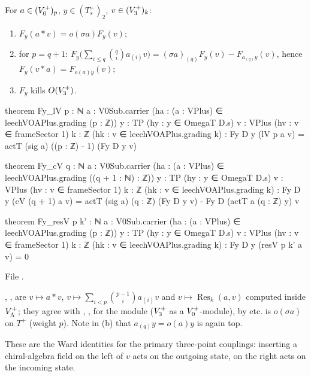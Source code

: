 \begin{theorem}\label{ch14:thm:Fy}
For $a\in(V_0^{+})_p$, $y\in(T_s^+)_2$, $v\in(V_3^{+})_k$:
\begin{enumerate}[label=(\alph*)]
\item $F_y(a*v)=o(\sigma a)F_y(v)$;
\item for $p=q+1$: $F_y\bigl(\sum_{i\le q}\binom qi a_{(i)}v\bigr)=(\sigma a)_{(q)}F_y(v)-F_{a_{(q)}y}(v)$, hence
  $F_y(v*a)=F_{o(a)y}(v)$;
\item $F_y$ kills $O(V_3^{+})$.
\end{enumerate}
\end{theorem}
\begin{leancode}
theorem Fy_lV {p : ℕ} {a : V0Sub.carrier} (ha : (a : VPlus) ∈ leechVOAPlus.grading (p : ℤ))
    {y : TP} (hy : y ∈ OmegaT D.s) {v : VPlus} (hv : v ∈ frameSector 1) {k : ℤ}
    (hk : v ∈ leechVOAPlus.grading k) :
    Fy D y (lV p a v) = actT (sig a) ((p : ℤ) - 1) (Fy D y v)

theorem Fy_cV {q : ℕ} {a : V0Sub.carrier} (ha : (a : VPlus) ∈ leechVOAPlus.grading ((q + 1 : ℕ) : ℤ))
    {y : TP} (hy : y ∈ OmegaT D.s) {v : VPlus} (hv : v ∈ frameSector 1) {k : ℤ}
    (hk : v ∈ leechVOAPlus.grading k) :
    Fy D y (cV (q + 1) a v) = actT (sig a) (q : ℤ) (Fy D y v) - Fy D (actT a (q : ℤ) y) v

theorem Fy_resV {p k' : ℕ} {a : V0Sub.carrier} (ha : (a : VPlus) ∈ leechVOAPlus.grading (p : ℤ))
    {y : TP} (hy : y ∈ OmegaT D.s) {v : VPlus} (hv : v ∈ frameSector 1) {k : ℤ}
    (hk : v ∈ leechVOAPlus.grading k) : Fy D y (resV p k' a v) = 0
\end{leancode}
File .

\begin{dictionary}
, ,  are $v\mapsto a*v$, $v\mapsto\sum_{i<p}\binom{p-1}ia_{(i)}v$ and
$v\mapsto\operatorname{Res}_k(a,v)$ computed inside $V_{\Lambda}^+$; they agree with , ,
 for the module  ($V_3^{+}$ as a $V_0^{+}$-module), by  etc.
 is $o(\sigma a)$ on $T^+$ (weight $p$).  Note in (b) that $a_{(q)}y=o(a)y$ is again top.
\end{dictionary}

\begin{physics}
These are the Ward identities for the primary three-point couplings: inserting a chiral-algebra
field on the left of $v$ acts on the outgoing state, on the right acts on the incoming state.
\end{physics}

